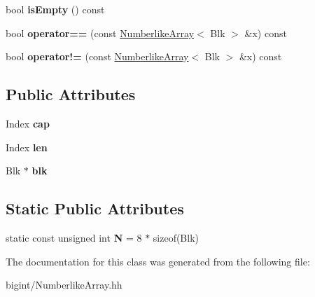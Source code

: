 \begin{DoxyCompactItemize}
bool {\bfseries is\+Empty} () const
\item 
\mbox{\label{class_numberlike_array_ab8abf1847351e6b1aa5f18bc47bd3bd6}} 
bool {\bfseries operator==} (const \mbox{\hyperlink{class_numberlike_array}{Numberlike\+Array}}$<$ Blk $>$ \&x) const
\item 
\mbox{\label{class_numberlike_array_a015fd3cc55a9c0f37ec43cfd0348b3f2}} 
bool {\bfseries operator!=} (const \mbox{\hyperlink{class_numberlike_array}{Numberlike\+Array}}$<$ Blk $>$ \&x) const
\end{DoxyCompactItemize}
\subsection*{Public Attributes}
\begin{DoxyCompactItemize}
\item 
\mbox{\label{class_numberlike_array_ab1a4e9d5eda64625ab32054645e82489}} 
Index {\bfseries cap}
\item 
\mbox{\label{class_numberlike_array_aa016f396175bd4084f40204a4d748eb9}} 
Index {\bfseries len}
\item 
\mbox{\label{class_numberlike_array_a378baefd25f016ba27ade9cc5dbb09b2}} 
Blk $\ast$ {\bfseries blk}
\end{DoxyCompactItemize}
\subsection*{Static Public Attributes}
\begin{DoxyCompactItemize}
\item 
\mbox{\label{class_numberlike_array_a25b7418a31008a14a5efd6610b0fa258}} 
static const unsigned int {\bfseries N} = 8 $\ast$ sizeof(Blk)
\end{DoxyCompactItemize}


The documentation for this class was generated from the following file\+:\begin{DoxyCompactItemize}
\item 
bigint/Numberlike\+Array.\+hh\end{DoxyCompactItemize}
